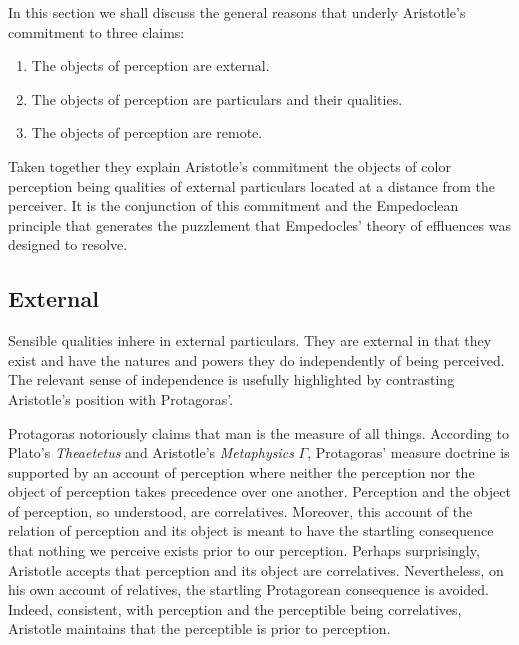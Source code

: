 In this section we shall discuss the general reasons that underly Aristotle's commitment to three claims:
\begin{enumerate}[(1)]
    \item The objects of perception are external.
    \item The objects of perception are particulars and their qualities.
    \item The objects of perception are remote.
\end{enumerate}
Taken together they explain Aristotle's commitment the objects of color perception being qualities of external particulars located at a distance from the perceiver. It is the conjunction of this commitment and the Empedoclean principle that generates the puzzlement that Empedocles' theory of effluences was designed to resolve.

\subsection{External} %
\label{sub:external}

Sensible qualities inhere in external particulars. They are external in that they exist and have the natures and powers they do independently of being perceived. The relevant sense of independence is usefully highlighted by contrasting Aristotle's position with Protagoras'.

Protagoras notoriously claims that man is the measure of all things. According to Plato's \emph{Theaetetus} and Aristotle's \emph{Metaphysics} \( \Gamma \), Protagoras' measure doctrine is supported by an account of perception where neither the perception nor the object of perception takes precedence over one another. Perception and the object of perception, so understood, are correlatives. Moreover, this account of the relation of perception and its object is meant to have the startling consequence that nothing we perceive exists prior to our perception. Perhaps surprisingly, Aristotle accepts that perception and its object are correlatives. Nevertheless, on his own account of relatives, the startling Protagorean consequence is avoided. Indeed, consistent, with perception and the perceptible being correlatives, Aristotle maintains that the perceptible is prior to perception.

